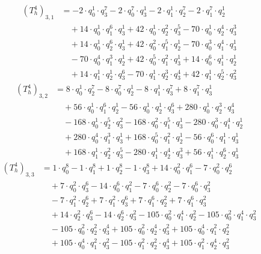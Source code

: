 \begin{align*}(T_{h}^4)_{3,1}&=-2\cdot q_0^{1}\cdot q_3^{7}-2\cdot q_0^{7}\cdot q_3^{1}-2\cdot q_1^{1}\cdot q_2^{7}-2\cdot q_1^{7}\cdot q_2^{1}\\
&\quad +14\cdot q_0^{1}\cdot q_1^{6}\cdot q_3^{1}+42\cdot q_0^{1}\cdot q_2^{2}\cdot q_3^{5}-70\cdot q_0^{1}\cdot q_2^{4}\cdot q_3^{3}\\
&\quad +14\cdot q_0^{1}\cdot q_2^{6}\cdot q_3^{1}+42\cdot q_0^{2}\cdot q_1^{5}\cdot q_2^{1}-70\cdot q_0^{3}\cdot q_1^{4}\cdot q_3^{1}\\
&\quad -70\cdot q_0^{4}\cdot q_1^{3}\cdot q_2^{1}+42\cdot q_0^{5}\cdot q_1^{2}\cdot q_3^{1}+14\cdot q_0^{6}\cdot q_1^{1}\cdot q_2^{1}\\
&\quad +14\cdot q_1^{1}\cdot q_2^{1}\cdot q_3^{6}-70\cdot q_1^{1}\cdot q_2^{3}\cdot q_3^{4}+42\cdot q_1^{1}\cdot q_2^{5}\cdot q_3^{2}\end{align*}
\begin{align*}(T_{h}^4)_{3,2}&=8\cdot q_0^{1}\cdot q_2^{7}-8\cdot q_0^{7}\cdot q_2^{1}-8\cdot q_1^{1}\cdot q_3^{7}+8\cdot q_1^{7}\cdot q_3^{1}\\
&\quad +56\cdot q_0^{1}\cdot q_1^{6}\cdot q_2^{1}-56\cdot q_0^{1}\cdot q_2^{1}\cdot q_3^{6}+280\cdot q_0^{1}\cdot q_2^{3}\cdot q_3^{4}\\
&\quad -168\cdot q_0^{1}\cdot q_2^{5}\cdot q_3^{2}-168\cdot q_0^{2}\cdot q_1^{5}\cdot q_3^{1}-280\cdot q_0^{3}\cdot q_1^{4}\cdot q_2^{1}\\
&\quad +280\cdot q_0^{4}\cdot q_1^{3}\cdot q_3^{1}+168\cdot q_0^{5}\cdot q_1^{2}\cdot q_2^{1}-56\cdot q_0^{6}\cdot q_1^{1}\cdot q_3^{1}\\
&\quad +168\cdot q_1^{1}\cdot q_2^{2}\cdot q_3^{5}-280\cdot q_1^{1}\cdot q_2^{4}\cdot q_3^{3}+56\cdot q_1^{1}\cdot q_2^{6}\cdot q_3^{1}\end{align*}
\begin{align*}(T_{h}^4)_{3,3}&=1\cdot q_0^{8}-1\cdot q_1^{8}+1\cdot q_2^{8}-1\cdot q_3^{8}+14\cdot q_0^{2}\cdot q_1^{6}-7\cdot q_0^{2}\cdot q_2^{6}\\
&\quad +7\cdot q_0^{2}\cdot q_3^{6}-14\cdot q_0^{6}\cdot q_1^{2}-7\cdot q_0^{6}\cdot q_2^{2}-7\cdot q_0^{6}\cdot q_3^{2}\\
&\quad -7\cdot q_1^{2}\cdot q_2^{6}+7\cdot q_1^{2}\cdot q_3^{6}+7\cdot q_1^{6}\cdot q_2^{2}+7\cdot q_1^{6}\cdot q_3^{2}\\
&\quad +14\cdot q_2^{2}\cdot q_3^{6}-14\cdot q_2^{6}\cdot q_3^{2}-105\cdot q_0^{2}\cdot q_1^{4}\cdot q_2^{2}-105\cdot q_0^{2}\cdot q_1^{4}\cdot q_3^{2}\\
&\quad -105\cdot q_0^{2}\cdot q_2^{2}\cdot q_3^{4}+105\cdot q_0^{2}\cdot q_2^{4}\cdot q_3^{2}+105\cdot q_0^{4}\cdot q_1^{2}\cdot q_2^{2}\\
&\quad +105\cdot q_0^{4}\cdot q_1^{2}\cdot q_3^{2}-105\cdot q_1^{2}\cdot q_2^{2}\cdot q_3^{4}+105\cdot q_1^{2}\cdot q_2^{4}\cdot q_3^{2}\end{align*}
